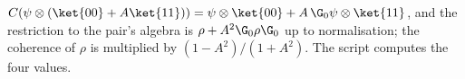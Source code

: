 $C(\psi \otimes (\ket{00} + A\ket{11})) = \psi\otimes\ket{00} + A\,\G_{0}\psi\otimes\ket{11}$, and the restriction to the pair's algebra is $\rho + A^{2}\G_{0}\rho\G_{0}$ up to normalisation; the coherence of $\rho$ is multiplied by $(1 - A^{2})/(1 + A^{2})$. The script computes the four values.
